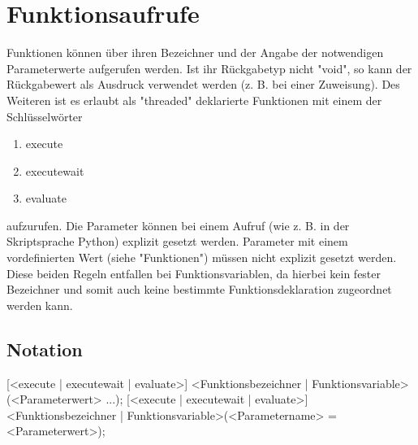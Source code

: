 \chapter{Funktionsaufrufe}
Funktionen können über ihren Bezeichner und der Angabe der notwendigen Parameterwerte aufgerufen werden. Ist ihr Rückgabetyp nicht "void", so kann
der Rückgabewert als Ausdruck verwendet werden (z. B. bei einer Zuweisung).
Des Weiteren ist es erlaubt als "threaded" deklarierte Funktionen mit einem der Schlüsselwörter
\begin{enumerate}
\item execute
\item executewait
\item evaluate
\end{enumerate}
aufzurufen.
Die Parameter können bei einem Aufruf (wie z. B. in der Skriptsprache Python) explizit gesetzt werden. Parameter mit einem vordefinierten Wert (siehe
"Funktionen") müssen nicht explizit gesetzt werden.
Diese beiden Regeln entfallen bei Funktionsvariablen, da hierbei kein fester Bezeichner und somit auch keine bestimmte Funktionsdeklaration zugeordnet werden kann.

\section{Notation}
[<execute | executewait | evaluate>] <Funktionsbezeichner | Funktionsvariable>(<Parameterwert> ...);
[<execute | executewait | evaluate>] <Funktionsbezeichner | Funktionsvariable>(<Parametername> = <Parameterwert>);